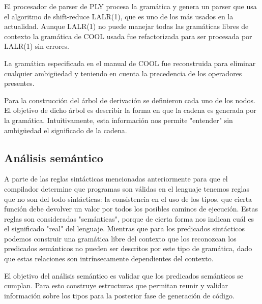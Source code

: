 \documentclass[11pt]{scrartcl} %
\begin{document}


El procesador de parser de PLY procesa la gramática y genera un parser que usa el algoritmo de shift-reduce LALR(1), que es uno de los más usados en la actualidad. Aunque LALR(1) no puede manejar todas las gramáticas libres de contexto la gramática de COOL usada fue refactorizada para ser procesada por LALR(1) sin errores. 

La gramática especificada en el manual de COOL fue reconstruida para eliminar cualquier ambigüedad y teniendo en cuenta la precedencia de los operadores presentes. 

Para la construcción del árbol de derivación se definieron cada uno de los nodos. El objetivo de dicho árbol es describir la forma en que la cadena es generada por la gramática. Intuitivamente, esta información nos permite "entender" sin ambigüedad el significado de la cadena. 



\subsection{Análisis semántico}

A parte de las reglas sintácticas mencionadas anteriormente para que el compilador determine que programas son válidas en el lenguaje tenemos reglas que no son del todo sintácticas: la consistencia en el uso de los tipos, que cierta función debe devolver un valor por todos los posibles caminos de ejecución. Estas reglas son consideradas "semánticas", porque de cierta forma nos indican cuál es el significado "real" del lenguaje. Mientras que para los predicados sintácticos podemos construir una gramática libre del contexto que los reconozcan los predicados semánticos no pueden ser descritos por este tipo de gramática, dado que estas relaciones son intrínsecamente dependientes del contexto. 

El objetivo del análisis semántico es validar que los predicados semánticos se cumplan. Para esto construye estructuras que permitan reunir y validar información sobre los tipos para la posterior fase de generación de código.
\end{document}
